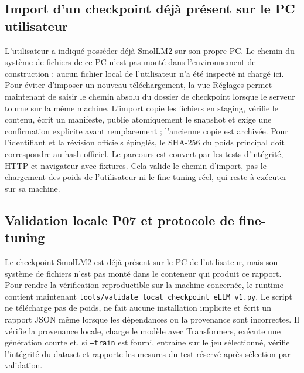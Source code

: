 \documentclass[11pt,a4paper]{article}
\begin{document}
\subsection{Import d’un checkpoint déjà présent sur le PC utilisateur}
L’utilisateur a indiqué posséder déjà SmolLM2 sur son propre PC. Le chemin du système de fichiers de ce PC n’est pas monté dans l’environnement de construction : aucun fichier local de l’utilisateur n’a été inspecté ni chargé ici. Pour éviter d’imposer un nouveau téléchargement, la vue Réglages permet maintenant de saisir le chemin absolu du dossier de checkpoint lorsque le serveur tourne sur la même machine. L’import copie les fichiers en staging, vérifie le contenu, écrit un manifeste, publie atomiquement le snapshot et exige une confirmation explicite avant remplacement ; l’ancienne copie est archivée. Pour l’identifiant et la révision officiels épinglés, le SHA-256 du poids principal doit correspondre au hash officiel. Le parcours est couvert par les tests d’intégrité, HTTP et navigateur avec fixtures. Cela valide le chemin d’import, pas le chargement des poids de l’utilisateur ni le fine-tuning réel, qui reste à exécuter sur sa machine.

\subsection{Validation locale P07 et protocole de fine-tuning}
Le checkpoint SmolLM2 est déjà présent sur le PC de l'utilisateur, mais son système de fichiers n'est pas monté dans le conteneur qui produit ce rapport. Pour rendre la vérification reproductible sur la machine concernée, le runtime contient maintenant \texttt{tools/validate\_local\_checkpoint\_eLLM\_v1.py}. Le script ne télécharge pas de poids, ne fait aucune installation implicite et écrit un rapport JSON même lorsque les dépendances ou la provenance sont incorrectes. Il vérifie la provenance locale, charge le modèle avec Transformers, exécute une génération courte et, si \texttt{--train} est fourni, entraîne sur le jeu sélectionné, vérifie l'intégrité du dataset et rapporte les mesures du test réservé après sélection par validation.
\end{document}
